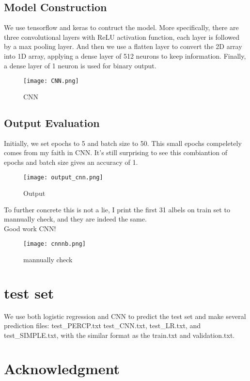 \documentclass[conference]{IEEEtran}
\begin{document}
\subsection{Model Construction}
We use tensorflow and keras to contruct the model. More specifically, there are three convolutional layers with ReLU activation function,
each layer is followed by a max pooling layer. And then we use a flatten layer to convert the 2D array into 1D array, applying a dense layer
of 512 neurons to keep information. Finally, a dense layer of 1 neuron is used for binary output.
\begin{figure}
    \centering
    \texttt{[image: CNN.png]}
    \caption{CNN}
    \label{fig9:CNN}
    \end{figure}



\subsection{Output Evaluation}
Initially, we set epochs to 5 and batch size to 50. This small epochs compeletely comes from my faith in CNN.
It's still surprising to see this combiantion of epochs and batch size gives an accuracy of 1.
\begin{figure}
    \centering
    \texttt{[image: output\_cnn.png]}
    \caption{Output}
    \label{fig10:Output}
    \end{figure}
To further concrete this is not a lie, I print the first 31 albels on train set to mannually check, and they are indeed the same.\\
Good work CNN!
\begin{figure}
    \centering
    \texttt{[image: cnnnb.png]}
    \caption{mannually check}
    \label{fig11:mannually check}
    \end{figure}
\section{test set}
We use both logistic regression and CNN to predict the test set and make several prediction files: test\_PERCP.txt test\_CNN.txt, test\_LR.txt, and test\_SIMPLE.txt, with 
the similar format as the train.txt and validation.txt.

\section*{Acknowledgment}
\end{document}
